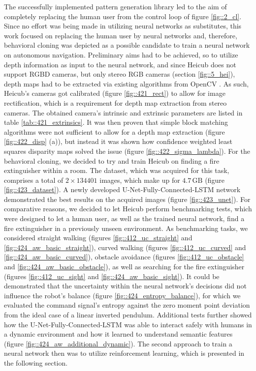 The successfully implemented pattern generation library led to the aim of completely replacing the human user from the control loop of figure \ref{fig::2_cl}. Since no effort was being made in utilizing neural networks as substitutes, this work focused on replacing the human user by neural networks and, therefore, behavioral cloning was depicted as a possible candidate to train a neural network on autonomous navigation. Preliminary aims had to be achieved, so to utilize depth information as input to the neural network, and since Heicub does not support RGBD cameras, but only stereo RGB cameras (section \ref{fig::5_hei}), depth maps had to be extracted via existing algorithms from OpenCV \cite{opencv_library}. As such, Heicub's cameras got calibrated (figure \ref{fig::421_rect}) to allow for image rectification, which is a requirement for depth map extraction from stereo cameras. The obtained camera's intrinsic and extrinsic parameters are listed in table \ref{tab::421_extrinsics}. It was then proven that simple block matching algorithms were not sufficient to allow for a depth map extraction (figure \ref{fig::422_disp} (a)), but instead it was shown how confidence weighted least squares disparity maps solved the issue (figure \ref{fig::422_sigma_lambda}). For the behavioral cloning, we decided to try and train Heicub on finding a fire extinguisher within a room. The dataset, which was acquired for this task, comprises a total of $2\times134401$ images, which make up for $4.7\,\text{GB}$ (figure \ref{fig::423_dataset}). A newly developed U-Net-Fully-Connected-LSTM network demonstrated the best results on the acquired images (figure \ref{fig::423_unet}). For comparative reasons, we decided to let Heicub perform benchmarking tests, which were designed to let a human user, as well as the trained neural network, find a fire extinguisher in a previously unseen environment. As benchmarking tasks, we considered straight walking (figures \ref{fig::412_uc_straight} and \ref{fig::424_aw_basic_straight}), curved walking (figures \ref{fig::412_uc_curved} and \ref{fig::424_aw_basic_curved}), obstacle avoidance (figures \ref{fig::412_uc_obstacle} and \ref{fig::424_aw_basic_obstacle}), as well as searching for the fire extinguisher (figures \ref{fig::412_uc_sight} and \ref{fig::424_aw_basic_sight}). It could be demonstrated that the uncertainty within the neural network's decisions did not influence the robot's balance (figure \ref{fig::424_entropy_balance}), for which we evaluated the command signal's entropy against the zero moment point deviation from the ideal case of a linear inverted pendulum. Additional tests further showed how the U-Net-Fully-Connected-LSTM was able to interact safely with humans in a dynamic environment and how it learned to understand semantic features (figure \ref{fig::424_aw_additional_dynamic}). The second approach to train a neural network then was to utilize reinforcement learning, which is presented in the following section.\\\\
